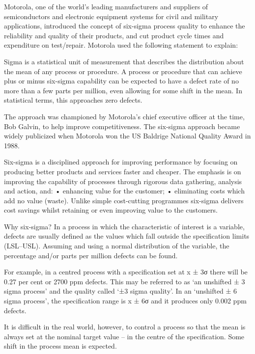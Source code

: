Motorola, one of the world’s leading manufacturers and suppliers of
semiconductors and electronic equipment systems for civil and military
applications, introduced the concept of six-sigma process quality to enhance the reliability and quality of their products, and cut product cycle times and expenditure on test/repair. Motorola used the following statement to explain:

Sigma is a statistical unit of measurement that describes the distribution about the mean of any process or procedure. A process or procedure that can achieve plus or minus six-sigma capability can be expected to have a defect rate of no more than a few parts per million, even allowing for some shift in the mean. In statistical terms, this approaches zero defects.

The approach was championed by Motorola’s chief executive officer at the
time, Bob Galvin, to help improve competitiveness. The six-sigma approach became widely publicized when Motorola won the US Baldrige National Quality Award in 1988.

Six-sigma is a disciplined approach for improving performance by focusing
on producing better products and services faster and cheaper. The emphasis is on improving the capability of processes through rigorous data gathering, analysis and action, and:
•	enhancing value for the customer;
•	eliminating costs which add no value (waste).
Unlike simple cost-cutting programmes six-sigma delivers cost savings
whilst retaining or even improving value to the customers.

Why six-sigma?
In a process in which the characteristic of interest is a variable, defects are usually defined as the values which fall outside the specification limits (LSL–USL). Assuming and using a normal distribution of the variable, the
percentage and/or parts per million defects can be found. 

For example, in a centred process with a specification set at x ± 3σ there
will be 0.27 per cent or 2700 ppm defects. This may be referred to as ‘an
unshifted ± 3 sigma process’ and the quality called ‘±3 sigma quality’. In an ‘unshifted ± 6 sigma process’, the specification range is x ± 6σ and it produces only 0.002 ppm defects.

It is difficult in the real world, however, to control a process so that the
mean is always set at the nominal target value – in the centre of the
specification. Some shift in the process mean is expected.




